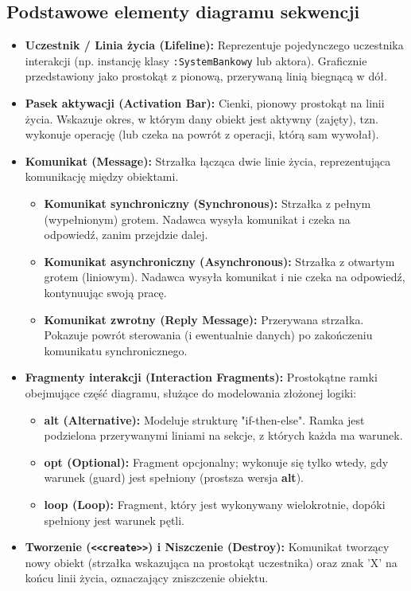 \documentclass[a4paper,12pt]{article}
\begin{document}
\subsection{Podstawowe elementy diagramu sekwencji}
\begin{itemize}
    \item \textbf{Uczestnik / Linia życia (Lifeline):} Reprezentuje pojedynczego uczestnika interakcji (np. instancję klasy \texttt{:SystemBankowy} lub aktora). Graficznie przedstawiony jako prostokąt z pionową, przerywaną linią biegnącą w dół.
    \item \textbf{Pasek aktywacji (Activation Bar):} Cienki, pionowy prostokąt na linii życia. Wskazuje okres, w którym dany obiekt jest aktywny (zajęty), tzn. wykonuje operację (lub czeka na powrót z operacji, którą sam wywołał).
    \item \textbf{Komunikat (Message):} Strzałka łącząca dwie linie życia, reprezentująca komunikację między obiektami.
        \begin{itemize}
            \item \textbf{Komunikat synchroniczny (Synchronous):} Strzałka z pełnym (wypełnionym) grotem. Nadawca wysyła komunikat i czeka na odpowiedź, zanim przejdzie dalej.
            \item \textbf{Komunikat asynchroniczny (Asynchronous):} Strzałka z otwartym grotem (liniowym). Nadawca wysyła komunikat i nie czeka na odpowiedź, kontynuując swoją pracę.
            \item \textbf{Komunikat zwrotny (Reply Message):} Przerywana strzałka. Pokazuje powrót sterowania (i ewentualnie danych) po zakończeniu komunikatu synchronicznego.
        \end{itemize}
    \item \textbf{Fragmenty interakcji (Interaction Fragments):} Prostokątne ramki obejmujące część diagramu, służące do modelowania złożonej logiki:
        \begin{itemize}
            \item \textbf{alt (Alternative):} Modeluje strukturę "if-then-else". Ramka jest podzielona przerywanymi liniami na sekcje, z których każda ma warunek.
            \item \textbf{opt (Optional):} Fragment opcjonalny; wykonuje się tylko wtedy, gdy warunek (guard) jest spełniony (prostsza wersja \textbf{alt}).
            \item \textbf{loop (Loop):} Fragment, który jest wykonywany wielokrotnie, dopóki spełniony jest warunek pętli.
        \end{itemize}
    \item \textbf{Tworzenie (\texttt{<<create>>}) i Niszczenie (Destroy):} Komunikat tworzący nowy obiekt (strzałka wskazująca na prostokąt uczestnika) oraz znak 'X' na końcu linii życia, oznaczający zniszczenie obiektu.
\end{itemize}
\end{document}
